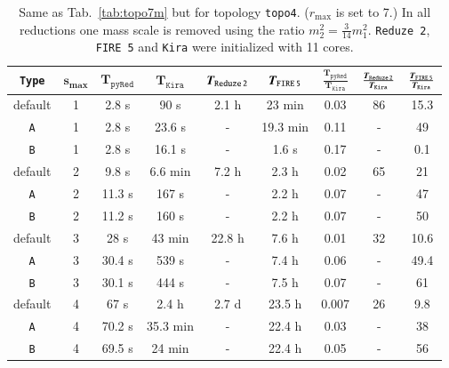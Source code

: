 \documentclass[a4paper,12pt]{scrartcl}
\newcommand*{\bm}{\boldsymbol}
\newcommand*{\kira}{\texttt{Kira}}
\newcommand*{\pyred}{\texttt{pyRed}}
\newcommand*{\firefive}{\texttt{FIRE\,5}}
\newcommand*{\reduzetwo}{\texttt{Reduze\,2}}
\def\Tab#1{{Tab.~\ref{#1}}}
\begin{document}
\begin{table}[htpb]
  \caption{Same as \Tab{tab:topo7m} but for topology \texttt{topo4}.
    ($r_{\max}$ is set to 7.)
    In all reductions one mass scale is removed using the ratio
    $m_{2}^{2}=\frac{3}{14}m_{1}^{2}$.
    \reduzetwo{}, \firefive{} and \kira{} were initialized with 11 cores. \label{tab:topo4}
  }
  \begin{center}\renewcommand{\arraystretch}{1.8}
  \begin{tabular}[\linewidth]{ccccccccc}
    \hline
    \texttt{Type}&
    $\bm{s_{\max}}$& $\bm{T_\pyred}$ & $\bm{T_\kira}$&
    $\bm{T_\reduzetwo}$&$\bm{T_\firefive}$&
    $\frac{\bm{T_\pyred}}{\bm{T_\kira}}$  &
    $\frac{\bm{T_\reduzetwo}}{\bm{T_\kira}}$&
    $\frac{\bm{T_\firefive}}{\bm{T_\kira}}$\\
    \hline
    default   &1 & 2.8 s  & 90 s     & 2.1 h  & 23 min  & 0.03  & 86 & 15.3  \\\hline
    \texttt{A}&1 & 2.8 s  & 23.6 s   & -      & 19.3 min& 0.11  & -  & 49    \\\hline
    \texttt{B}&1 & 2.8 s  & 16.1 s   & -      & 1.6 s   & 0.17  & -  & 0.1   \\\hline\hline
    default   &2 & 9.8 s  & 6.6 min  & 7.2 h  & 2.3 h   & 0.02  & 65 & 21    \\\hline
    \texttt{A}&2 & 11.3 s & 167 s    &  -     & 2.2 h   & 0.07  & -  & 47    \\\hline
    \texttt{B}&2 & 11.2 s & 160 s    &  -     & 2.2 h   & 0.07  & -  & 50    \\\hline\hline
    default   &3 & 28 s   & 43 min   & 22.8 h & 7.6 h   & 0.01  & 32 & 10.6  \\\hline
    \texttt{A}&3 & 30.4 s & 539 s    & -      & 7.4 h   & 0.06  & -  & 49.4  \\\hline
    \texttt{B}&3 & 30.1 s & 444 s    & -      & 7.5 h   & 0.07  & -  & 61    \\\hline\hline
    default   &4 & 67 s   & 2.4 h    & 2.7 d  & 23.5 h  & 0.007 & 26 & 9.8   \\\hline
    \texttt{A}&4 & 70.2 s & 35.3 min & -      & 22.4 h  & 0.03  & -  & 38    \\\hline
    \texttt{B}&4 & 69.5 s & 24 min   & -      & 22.4 h  & 0.05  & -  & 56    \\\hline
  \end{tabular}
  \end{center}
\end{table}
\end{document}
